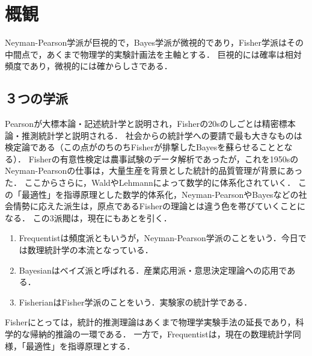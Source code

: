 \documentclass[uplatex,dvipdfmx]{jsreport}
\begin{document}
\section{概観}

\begin{tcolorbox}[colframe=ForestGreen, colback=ForestGreen!10!white,breakable,colbacktitle=ForestGreen!40!white,coltitle=black,fonttitle=\bfseries\sffamily,
title=]
    Neyman-Pearson学派が巨視的で，Bayes学派が微視的であり，Fisher学派はその中間点で，あくまで物理学的実験計画法を主軸とする．
    巨視的には確率は相対頻度であり，微視的には確からしさである．
\end{tcolorbox}

\subsection{３つの学派}

\begin{history}
    Pearsonが大標本論・記述統計学と説明され，Fisherの20sのしごとは精密標本論・推測統計学と説明される．
    社会からの統計学への要請で最も大きなものは検定論である（この点がのちのちFisherが排撃したBayesを蘇らせることとなる）．
    Fisherの有意性検定は農事試験のデータ解析であったが，これを1950sのNeyman-Pearsonの仕事は，大量生産を背景とした統計的品質管理が背景にあった．
    ここからさらに，WaldやLehmannによって数学的に体系化されていく．
    この「最適性」を指導原理とした数学的体系化，Neyman-PearsonやBayesなどの社会情勢に応えた派生は，原点であるFisherの理論とは違う色を帯びていくことになる．
    この3派閥は，現在にもあとを引く．
    \begin{enumerate}
        \item Frequentistは頻度派ともいうが，Neyman-Pearson学派のことをいう．今日では数理統計学の本流となっている．
        \item Bayesianはベイズ派と呼ばれる．産業応用派・意思決定理論への応用である．
        \item FisherianはFisher学派のことをいう．実験家の統計学である．
    \end{enumerate}
\end{history}

\begin{discussion}
    Fisherにとっては，統計的推測理論はあくまで物理学実験手法の延長であり，科学的な帰納的推論の一環である．
    一方で，Frequentistは，現在の数理統計学同様，「最適性」を指導原理とする．
\end{discussion}
\end{document}
